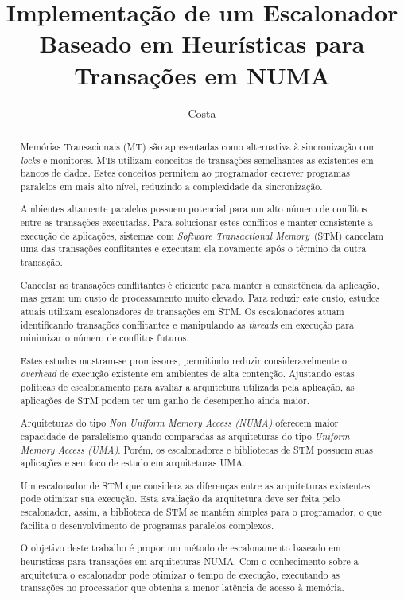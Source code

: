 \documentclass[diss-proposta,nocipinfo]{texufpel}
\title{Implementação de um Escalonador Baseado em Heurísticas para Transações em NUMA}
\author{Costa}{Michael Alexandre}
\begin{document}
\maketitle
\sloppy

\begin{abstract}

  Memórias Transacionais (MT) são apresentadas como alternativa à sincronização com \emph{locks} e monitores. MTs utilizam conceitos de transações semelhantes as existentes em bancos de dados. Estes conceitos permitem ao programador escrever programas paralelos em mais alto nível, reduzindo a complexidade da sincronização.

  Ambientes altamente paralelos possuem potencial para um alto número de conflitos entre as transações executadas. Para solucionar estes conflitos e manter consistente a execução de aplicações, sistemas com \emph{Software Transactional Memory}~(STM) cancelam uma das transações conflitantes e executam ela novamente após o término da outra transação.

  Cancelar as transações conflitantes é eficiente para manter a consistência da aplicação, mas geram um custo de processamento muito elevado. Para reduzir este custo, estudos atuais utilizam escalonadores de transações em STM. Os escalonadores atuam identificando transações conflitantes e manipulando as \emph{threads} em execução para minimizar o número de conflitos futuros.

  Estes estudos mostram-se promissores, permitindo reduzir consideravelmente o \emph{overhead} de execução existente em ambientes de alta contenção. Ajustando estas políticas de escalonamento para avaliar a arquitetura utilizada pela aplicação, as aplicações de STM podem ter um ganho de desempenho ainda maior.

  Arquiteturas do tipo \emph{Non Uniform Memory Access (NUMA)} oferecem maior capacidade de paralelismo quando comparadas as arquiteturas do tipo \emph{Uniform Memory Access (UMA)}. Porém, os escalonadores e bibliotecas de STM possuem suas aplicações e seu foco de estudo em arquiteturas UMA.

  Um escalonador de STM que considera as diferenças entre as arquiteturas existentes pode otimizar sua execução. Esta avaliação da arquitetura deve ser feita pelo escalonador, assim, a biblioteca de STM se mantém simples para o programador, o que facilita o desenvolvimento de programas paralelos complexos.

  O objetivo deste trabalho é propor  um método de escalonamento baseado em heurísticas para transações em arquiteturas NUMA. Com o conhecimento sobre a arquitetura o escalonador pode otimizar o tempo de execução, executando as transações no processador que obtenha a menor latência de acesso à memória.


\end{abstract}
\end{document}
